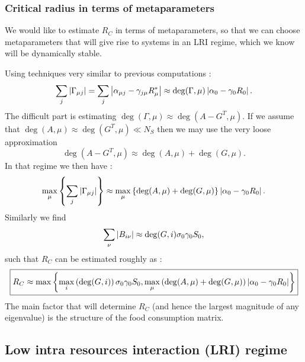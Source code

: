 \documentclass[12pt, titlepage]{report}
\begin{document}
\subsubsection{Critical radius in terms of metaparameters}
We would like to estimate $R_C$ in terms of metaparameters, so that we can choose metaparameters that will give rise to systems in an LRI regime, which we know will be dynamically stable.

Using techniques very similar to previous computations :
\begin{equation}
\sum_j \left|{\Gamma_{\mu j}}\right| = \sum_j \left|{\alpha_{\mu j}-\gamma_{j\mu}R^*_\mu}\right| \approx \deg(\Gamma, \mu)\left|{\alpha_0 - \gamma_0 R_0}\right|.
\end{equation}
The difficult part is estimating $\deg(\Gamma, \mu) \approx \deg(A-G^T, \mu)$. If we assume that $\deg(A, \mu)\approx \deg(G^T, \mu) \ll N_S$ then we may use the very loose approximation
\begin{equation}
\deg(A-G^T, \mu) \approx \deg(A, \mu)+\deg(G, \mu).
\end{equation}
In that regime we then have :
\begin{equation}
\max_\mu\left\{\sum_j \left|{\Gamma_{\mu j}}\right|\right\} \approx \max_\mu\left\{\deg(A, \mu)+\deg(G, \mu)\right\} \left|{\alpha_0-\gamma_0 R_0}\right|.
\end{equation}
Similarly we find
\begin{equation}
\sum_\nu \left|{B_{i\nu}}\right| \approx \deg(G, i) \sigma_0 \gamma_0 S_0,
\end{equation}
such that $R_C$ can be estimated roughly as :
\begin{equation}\boxed{
R_C \approx \max\left\{ \max_i\left(\deg(G,i)\right) \sigma_0 \gamma_0 S_0, \max_\mu\left(\deg(A,\mu)+\deg(G,\mu)\right)\left|{\alpha_0-\gamma_0 R_0}\right|\right\}
}\label{eq : estimate R_C metaparameters}
\end{equation}
The main factor that will determine $R_C$ (and hence the largest magnitude of any eigenvalue) is the structure of the food consumption matrix.


\subsection{Low intra resources interaction (LRI) regime }
\end{document}
